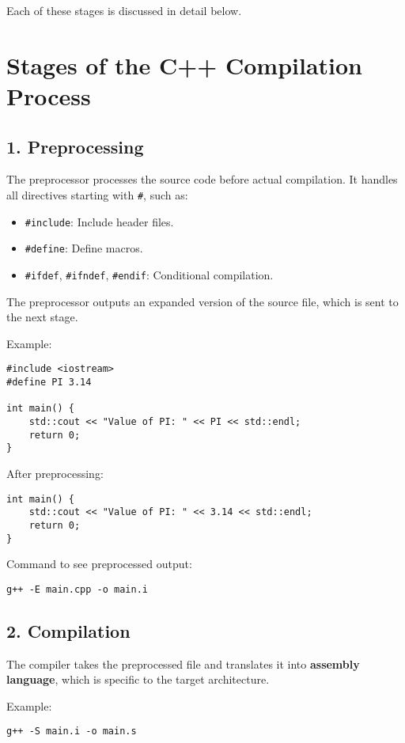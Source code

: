 Each of these stages is discussed in detail below.

\section{Stages of the C++ Compilation Process}

\subsection{1. Preprocessing}
The preprocessor processes the source code before actual compilation. It handles all directives starting with \texttt{\#}, such as:
\begin{itemize}
    \item \texttt{\#include}: Include header files.
    \item \texttt{\#define}: Define macros.
    \item \texttt{\#ifdef}, \texttt{\#ifndef}, \texttt{\#endif}: Conditional compilation.
\end{itemize}

The preprocessor outputs an expanded version of the source file, which is sent to the next stage.

\noindent Example:
\begin{verbatim}
#include <iostream>
#define PI 3.14

int main() {
    std::cout << "Value of PI: " << PI << std::endl;
    return 0;
}
\end{verbatim}

After preprocessing:
\begin{verbatim}
int main() {
    std::cout << "Value of PI: " << 3.14 << std::endl;
    return 0;
}
\end{verbatim}

Command to see preprocessed output:
\begin{verbatim}
g++ -E main.cpp -o main.i
\end{verbatim}

\subsection{2. Compilation}
The compiler takes the preprocessed file and translates it into \textbf{assembly language}, which is specific to the target architecture.

\noindent Example:
\begin{verbatim}
g++ -S main.i -o main.s
\end{verbatim}


